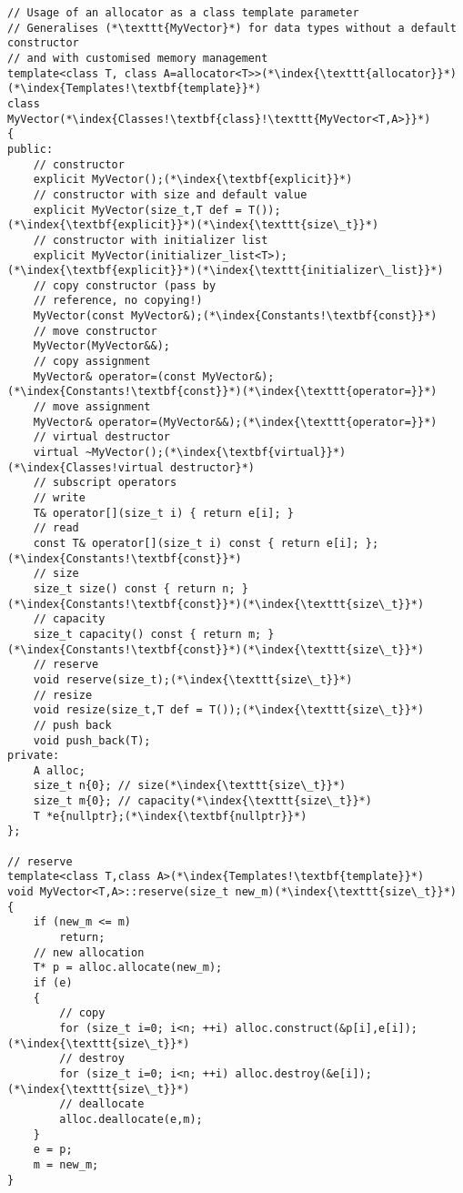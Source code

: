 \documentclass[10pt]{article}
\begin{document}
\begin{lstlisting}
// Usage of an allocator as a class template parameter
// Generalises (*\texttt{MyVector}*) for data types without a default constructor
// and with customised memory management
template<class T, class A=allocator<T>>(*\index{\texttt{allocator}}*)(*\index{Templates!\textbf{template}}*)
class MyVector(*\index{Classes!\textbf{class}!\texttt{MyVector<T,A>}}*)
{
public:
    // constructor
    explicit MyVector();(*\index{\textbf{explicit}}*)
    // constructor with size and default value
    explicit MyVector(size_t,T def = T());(*\index{\textbf{explicit}}*)(*\index{\texttt{size\_t}}*)
    // constructor with initializer list
    explicit MyVector(initializer_list<T>);(*\index{\textbf{explicit}}*)(*\index{\texttt{initializer\_list}}*)
    // copy constructor (pass by
    // reference, no copying!)
    MyVector(const MyVector&);(*\index{Constants!\textbf{const}}*)
    // move constructor
    MyVector(MyVector&&);
    // copy assignment
    MyVector& operator=(const MyVector&);(*\index{Constants!\textbf{const}}*)(*\index{\texttt{operator=}}*)
    // move assignment
    MyVector& operator=(MyVector&&);(*\index{\texttt{operator=}}*)
    // virtual destructor
    virtual ~MyVector();(*\index{\textbf{virtual}}*)(*\index{Classes!virtual destructor}*)
    // subscript operators
    // write
    T& operator[](size_t i) { return e[i]; }
    // read
    const T& operator[](size_t i) const { return e[i]; };(*\index{Constants!\textbf{const}}*)
    // size
    size_t size() const { return n; }(*\index{Constants!\textbf{const}}*)(*\index{\texttt{size\_t}}*)
    // capacity
    size_t capacity() const { return m; }(*\index{Constants!\textbf{const}}*)(*\index{\texttt{size\_t}}*)
    // reserve
    void reserve(size_t);(*\index{\texttt{size\_t}}*)
    // resize
    void resize(size_t,T def = T());(*\index{\texttt{size\_t}}*)
    // push back
    void push_back(T);
private:
    A alloc;
    size_t n{0}; // size(*\index{\texttt{size\_t}}*)
    size_t m{0}; // capacity(*\index{\texttt{size\_t}}*)
    T *e{nullptr};(*\index{\textbf{nullptr}}*)
};

// reserve
template<class T,class A>(*\index{Templates!\textbf{template}}*)
void MyVector<T,A>::reserve(size_t new_m)(*\index{\texttt{size\_t}}*)
{
    if (new_m <= m)
        return;
    // new allocation
    T* p = alloc.allocate(new_m);
    if (e)
    {
        // copy
        for (size_t i=0; i<n; ++i) alloc.construct(&p[i],e[i]);(*\index{\texttt{size\_t}}*)
        // destroy
        for (size_t i=0; i<n; ++i) alloc.destroy(&e[i]);(*\index{\texttt{size\_t}}*)
        // deallocate
        alloc.deallocate(e,m);
    }
    e = p;
    m = new_m;
}
\end{lstlisting}
\end{document}
